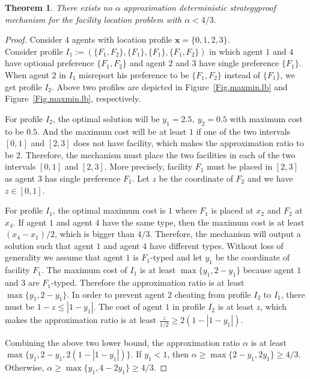 \documentclass[twoside,11pt]{article}
\newtheorem{theorem}{Theorem}
\newcommand{\bd}{\mathbf}
\begin{document}
\begin{theorem}\label{t-min-max-lower}
There exists no $\alpha$ approximation deterministic strategyproof mechanism for the facility location problem with $\alpha<4/3$.
\end{theorem}
\begin{proof}
Consider $4$ agents with location profile $\bd{x}=\{0,1,2,3\}$. \\
Consider profile $I_1 := (\{F_1,F_2\},\{F_1\},\{F_1\},\{F_1,F_2\})$ in which agent $1$ and $4$ have optional preference $\{F_1,F_2\}$ and agent $2$ and $3$ have single preference $\{F_1\}$.
When agent $2$ in $I_1$ misreport his preference to be $\{F_1,F_2\}$ instead of $\{F_1\}$, we get profile $I_2$. Above two profiles are depicted in Figure~\ref{Fig.maxmin.lb}\protect{} and Figure~\ref{Fig.maxmin.lb}\protect{}, respectively.

For profile $I_2$, the optimal solution will be $y_1 = 2.5,~y_2 = 0.5$ with maximum cost to be $0.5$.
And the maximum cost will be at least $1$ if one of the two intervals $[0, 1]$ and $[2, 3]$ does not have facility, which makes the approximation ratio to be $2$. Therefore, the mechanism must place the two facilities in each of the two intervals $[0, 1]$ and $[2, 3]$. More precisely, facility $F_1$ must be placed in $[2, 3]$ as agent $3$ has single preference $F_1$.
Let $z$ be the coordinate of $F_2$ and we have $z \in [0,1]$.

For profile $I_1$, the optimal maximum cost is $1$ where $F_1$ is placed at $x_2$ and $F_2$ at $x_4$.
If agent $1$ and agent $4$ have the same type, then the maximum cost is at least $(x_4-x_1)/2$, which is bigger than $4/3$. Therefore, the mechanism will output a solution such that agent $1$ and agent $4$ have different types.
Without loss of generality we assume that agent $1$ is $F_1$-typed and let $y_1$ be the coordinate of facility $F_1$.
%
The maximum cost of $I_1$ is at least $\max\{y_1,2-y_1\}$ because agent $1$ and $3$ are $F_1$-typed. Therefore the approximation ratio is at least $\max\{y_1,2-y_1\}$.
%
In order to prevent agent $2$ cheating from profile $I_2$ to $I_1$, there must  be $1 - z \le |1 - y_1|$. The cost of agent $1$ in profile $I_2$ is at least $z$, which makes the approximation ratio is at least $\frac{z}{1/2} \ge 2(1-|1-y_1|)$.

Combining the above two lower bound, the approximation ratio $\alpha$ is at least $\max\{y_1,2-y_1,2(1-|1-y_1|)\}$.
If $y_1<1$, then $\alpha \ge \max\{2-y_1,2 y_1\} \ge 4/3$.
Otherwise, $\alpha \ge \max\{y_1,4 - 2 y_1\} \ge 4/3$.
\end{proof}
\end{document}
